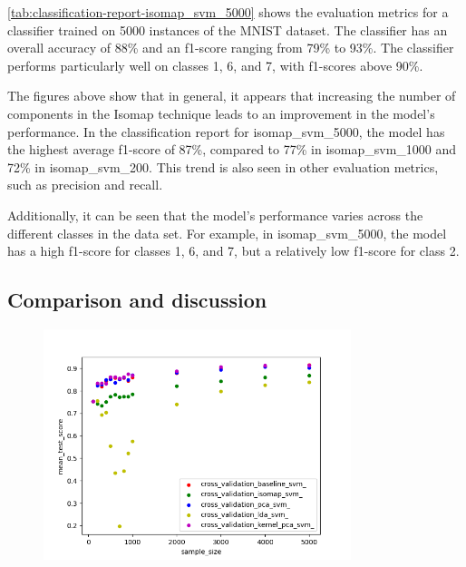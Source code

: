 


\ref{tab:classification-report-isomap_svm_5000} shows the evaluation metrics for a classifier trained on 5000 instances of the MNIST dataset. The classifier has an overall accuracy of 88\% and an f1-score ranging from 79\% to 93\%. The classifier performs particularly well on classes 1, 6, and 7, with f1-scores above 90\%.


The figures above show that in general, it appears that increasing the number of components in the Isomap technique leads to an improvement in the model's performance. In the classification report for isomap\_svm\_5000, the model has the highest average f1-score of 87\%, compared to 77\% in isomap\_svm\_1000 and 72\% in isomap\_svm\_200. This trend is also seen in other evaluation metrics, such as precision and recall.
    
Additionally, it can be  seen that the model's performance varies across the different classes in the data set. For example, in isomap\_svm\_5000, the model has a high f1-score for classes 1, 6, and 7, but a relatively low f1-score for class 2.


\subsection{Comparison and discussion}

\begin{figure}[htb!]
    \centering
    \includegraphics[width=0.8\textwidth]{figures/test_score_based_on_size.png}
    \caption{}
    \label{fig:experiment_4_performance_size}
\end{figure}


